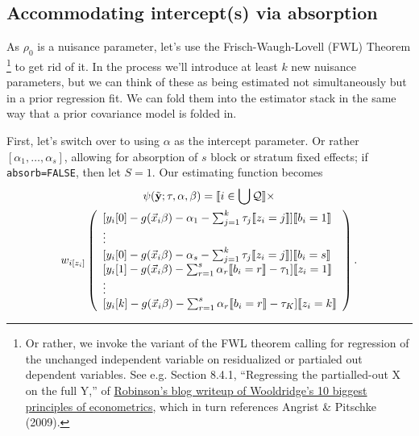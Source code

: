 \documentclass{article}
\DeclarePairedDelimiter{\indicator}{\llbracket}{\rrbracket}
\newcommand{\owt}[1][z_i]{\ensuremath{w_{i[#1]}}}
\begin{document}
\subsection{Accommodating intercept(s) via absorption}\label{sec:accomm-interc-via}
As $\rho_{0}$ is a nuisance parameter, let's use the
Frisch-Waugh-Lovell (FWL) Theorem%
\footnote{Or rather, we invoke the variant of the FWL theorem calling
  for regression of the unchanged independent variable on residualized
or partialed out dependent variables.  See e.g. Section 8.4.1,
``Regressing the partialled-out X on the full Y,'' of
\href{https://bookdown.org/ts_robinson1994/10_fundamental_theorems_for_econometrics/frisch.html}{Robinson's
  blog writeup of Wooldridge's 10 biggest principles of econometrics},
which in turn references Angrist \& Pitschke (2009).} to get rid of it.  In the process we'll
introduce at least $k$ new nuisance parameters, but we can think of these as
being estimated not simultaneously but in a prior regression fit.
We can fold them into the estimator stack in the same way that a prior
covariance model is folded in.

First, let's switch over to using $\alpha$ as the intercept
parameter. Or rather $[\alpha_{1}, \ldots, \alpha_{s}]$, allowing for
absorption of $s$ block or stratum fixed effects; if
\texttt{absorb=FALSE}, then let $S=1$.    Our estimating function becomes
\begin{multline}
  \label{eq:9}
  \psi(\tilde{\mathbf{y}}; \tau, \alpha, \beta) =
  \indicator{i \in \bigcup \mathcal{Q}} \times \\
  \owt{}
  \left(
    \begin{array}{l}
           [y_{i}[0] - g(\vec{x}_{i}\beta)-
                  \alpha_{1} -
      \sum_{j=1}^{k}\tau_{j}\indicator{z_{i}=j}]\indicator{b_{i}=1}\\
      \vdots\\ 
          {} [y_{i}[0] - g(\vec{x}_{i}\beta)-
                  \alpha_{s} -
      \sum_{j=1}^{k}\tau_{j}\indicator{z_{i}=j}]\indicator{b_{i}=s}\\      
         {}  [y_{i}[1] - g(\vec{x}_{i}\beta)-
                  \sum_{r=1}^s\alpha_r\indicator{b_i=r}-\tau_{1}]\indicator{z_{i}=1}\\
                  \vdots \\
          {} [y_{i}[k] - g(\vec{x}_{i}\beta)-
                 \sum_{r=1}^s\alpha_r\indicator{b_i=r} - \tau_{K}]\indicator{z_{i}=k}\\
    \end{array}
\right).
\end{multline}
\end{document}
